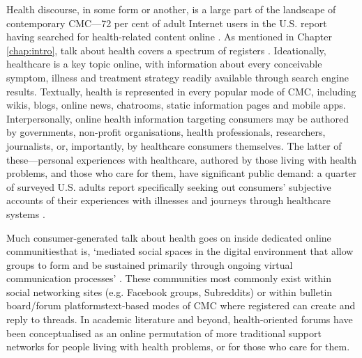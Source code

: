 Health discourse, in some form or another, is a large part of the landscape of contemporary \gls{CMC}---72 per cent of adult Internet users in the U.S. report having searched for health\hyp{}related content online \cite{fox_health_2013,fox_social_2014}. As mentioned in Chapter \ref{chap:intro}, talk about health covers a spectrum of registers \cite[in the systemic-functional sense\textemdash{}see][as well as Section \ref{sect:sfl}]{halliday_introduction_2004}. Ideationally, healthcare is a key topic online, with information about every conceivable symptom, illness and treatment strategy readily available through search engine results. Textually, health is represented in every popular \gls{mode} of \gls{CMC}, including wikis, blogs, online news, chatrooms, static information pages and mobile apps. Interpersonally, online health information targeting \glspl{consumer}%
may be authored by governments, non\hyp{}profit organisations, health professionals, researchers, journalists, or, importantly, by healthcare consumers themselves. The latter of these---personal experiences with healthcare, authored by those living with health problems, and those who care for them, have significant public demand: a quarter of surveyed U.S. adults report specifically seeking out \glspl{consumer}' subjective accounts of their experiences with illnesses and journeys through healthcare systems \cite{fox_social_2014}.

Much consumer\hyp{}generated talk about health goes on inside dedicated online communities\textemdash{}that is, `mediated social spaces in the digital environment that allow groups to form and be sustained primarily through ongoing virtual communication processes' \cite[p.~986]{shen_effects_2013}. These communities most commonly exist within social networking sites (e.g. Facebook groups, Subreddits) or within bulletin board\slash \gls{forum} platforms\textemdash{}text-based \glspl{mode} of \gls{CMC} where registered  can create and reply to \glspl{thread}. In academic literature and beyond, health\hyp{}oriented \glspl{forum} have been conceptualised as \textemdash{}an online permutation of more traditional support networks for people living with health problems, or for those who care for them.


